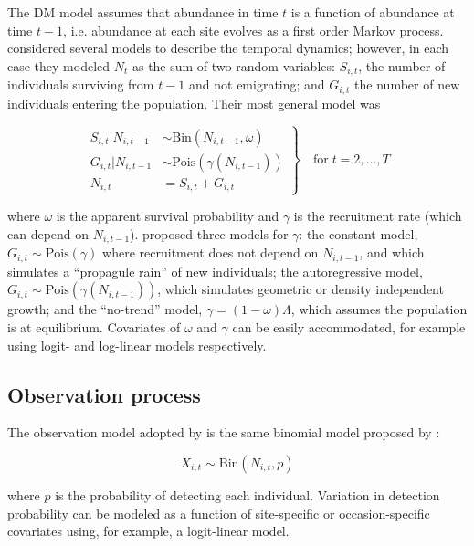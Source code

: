 \documentclass[12pt,english]{article}
\begin{document}
\begin{spacing}{1.9}
\begin{flushleft}
The DM model assumes that abundance in time $t$ is a function of
abundance at time $t-1$, i.e. abundance at each site evolves as a
first order Markov process. 
\citet{dail_madsen:2011} considered several models to describe the temporal dynamics;
however, in each case they modeled $N_t$ as the sum of two random variables:
$S_{i,t}$, the number of individuals surviving from $t-1$ and not
emigrating; and $G_{i,t}$ the number of new individuals entering
the population. Their most general model was
\begin{linenomath*}
\begin{equation}
\left.\begin{aligned}
S_{i,t}|N_{i,t-1} &\sim \mathrm{Bin}(N_{i,t-1}, \omega) \\
G_{i,t}|N_{i,t-1} &\sim \mathrm{Pois}(\gamma(N_{i,t-1})) \\
N_{i,t} &= S_{i,t}+G_{i,t}
\end{aligned}\right\} \quad \text{for} \; t=2,\hdots,T
\label{eq:Nt}
\end{equation}
\end{linenomath*}
where $\omega$ is the apparent survival probability and $\gamma$
is the recruitment rate (which can depend on $N_{i,t-1}$).
\citet{dail_madsen:2011} proposed three
models for $\gamma$: the constant model,
$G_{i,t} \sim \mathrm{Pois}(\gamma)$ where recruitment does not
depend on $N_{i,t-1}$, and which simulates a ``propagule rain'' of new
individuals; the autoregressive model, $G_{i,t} \sim
\mathrm{Pois}(\gamma(N_{i,t-1}))$, which
simulates geometric or density independent growth; and the
``no-trend'' model, $\gamma = (1-\omega)\Lambda$, which assumes the
population is at equilibrium. Covariates of
$\omega$ and $\gamma$ can be easily accommodated, for example
using logit- and log-linear models respectively.


\subsection*{Observation process}

The observation model adopted by \citet{dail_madsen:2011} is the same
binomial model proposed by \citet{royle:2004biom}: 
\begin{linenomath*}
\begin{equation}
  X_{i,t} \sim \mathrm{Bin}(N_{i,t}, p)
  \label{eq:p1}
\end{equation}
\end{linenomath*}
where $p$ is the probability of detecting each individual. Variation
in detection probability can be modeled as a function of site-specific
or occasion-specific covariates using, for example, a logit-linear model.


\end{flushleft}
\end{spacing}
\end{document}
